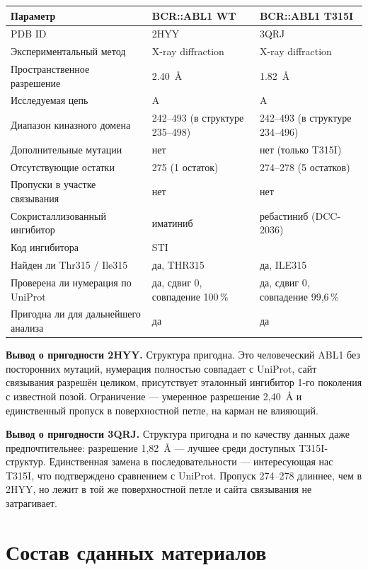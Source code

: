 \documentclass[12pt,a4paper]{article}
\newcommand{\code}[1]{{\ttfamily #1}}
\begin{document}
\begin{center}
\begin{tabular}{L{4.8cm}L{4.9cm}L{4.9cm}}
\toprule
\textbf{Параметр} & \textbf{BCR::ABL1 WT} & \textbf{BCR::ABL1 T315I} \\
\midrule
PDB ID & 2HYY & 3QRJ \\
Экспериментальный метод & X-ray diffraction & X-ray diffraction \\
Пространственное разрешение & 2.40~\AA & 1.82~\AA \\
Исследуемая цепь & A & A \\
Диапазон киназного домена & 242--493 (в структуре 235--498) &
242--493 (в структуре 234--496) \\
Дополнительные мутации & нет & нет (только T315I) \\
Отсутствующие остатки & 275 (1 остаток) & 274--278 (5 остатков) \\
Пропуски в участке связывания & нет & нет \\
Сокристаллизованный ингибитор & иматиниб & ребастиниб (DCC-2036) \\
Код ингибитора & \code{STI} & \code{919} \\
Найден ли Thr315 / Ile315 & да, THR315 & да, ILE315 \\
Проверена ли нумерация по UniProt & да, сдвиг 0, совпадение 100\,\% &
да, сдвиг 0, совпадение 99{,}6\,\% \\
Пригодна ли для дальнейшего анализа & да & да \\
\bottomrule
\end{tabular}
\end{center}

\medskip
\noindent\textbf{Вывод о пригодности 2HYY.} Структура пригодна. Это человеческий ABL1
без посторонних мутаций, нумерация полностью совпадает с UniProt, сайт связывания
разрешён целиком, присутствует эталонный ингибитор 1-го поколения с известной позой.
Ограничение --- умеренное разрешение 2{,}40~\AA{} и единственный пропуск в поверхностной
петле, на карман не влияющий.

\medskip
\noindent\textbf{Вывод о пригодности 3QRJ.} Структура пригодна и по качеству данных даже
предпочтительнее: разрешение 1{,}82~\AA{} --- лучшее среди доступных T315I-структур.
Единственная замена в последовательности --- интересующая нас T315I, что подтверждено
сравнением с UniProt. Пропуск 274--278 длиннее, чем в 2HYY, но лежит в той же
поверхностной петле и сайта связывания не затрагивает.

\section{Состав сданных материалов}
\end{document}
